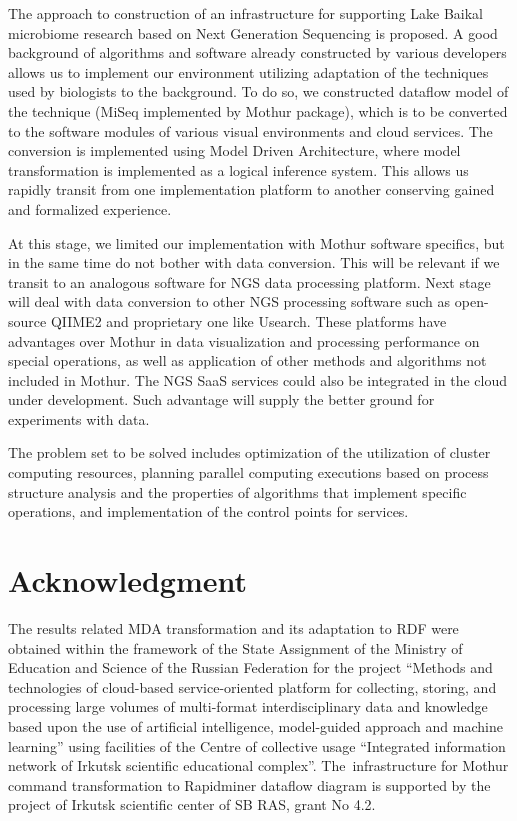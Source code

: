 \documentclass[a4paper]{jpconf}
\begin{document}
The approach to construction of an infrastructure for supporting Lake Baikal microbiome research based on Next Generation Sequencing is proposed. A good background of algorithms and software already constructed by various developers allows us to implement our environment utilizing adaptation of the techniques used by biologists to the background.  To do so, we constructed dataflow model of the technique (MiSeq implemented by Mothur package), which is to be converted to the software modules of various visual environments and cloud services.  The conversion is implemented using Model Driven Architecture, where model transformation is implemented as a logical inference system. This allows us rapidly transit from one implementation platform to another conserving gained and formalized experience.

At this stage, we limited our implementation with Mothur software specifics, but in the same time do not bother with data conversion.  This will be relevant if we transit to an analogous software for NGS data processing platform.  Next stage will deal with data conversion to other NGS processing software such as open-source QIIME2 and proprietary one like Usearch.  These platforms have advantages over Mothur in data visualization and processing performance on special operations, as well as application of other methods and algorithms not included in Mothur. The NGS SaaS services \cite{guo16,kwon15} could also be integrated in the cloud under development.  Such advantage will supply the better ground for experiments with data.

The problem set to be solved includes optimization of the utilization of cluster computing resources, planning parallel computing executions based on process structure analysis and the properties of algorithms that implement specific operations, and implementation of the control points for services.

\section*{Acknowledgment}
The results related MDA transformation and its adaptation to RDF were obtained within the framework of the State Assignment of the Ministry of Education and Science of the Russian Federation for the project ``Methods and technologies of cloud-based service-oriented platform for collecting, storing, and processing large volumes of multi-format interdisciplinary data and knowledge based upon the use of artificial intelligence, model-guided approach and machine learning'' using facilities of the Centre of collective usage ``Integrated information network of Irkutsk scientific educational complex''. The~infrastructure  for Mothur command transformation to Rapidminer dataflow diagram is supported by the project of Irkutsk scientific center of SB RAS, grant No 4.2.
\end{document}
